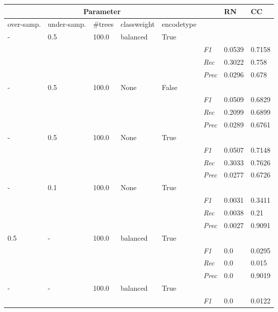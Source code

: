 \begin{table}[]
    \tiny
    \tabcolsep=0.11cm
    \begin{tabularx}{\textwidth}{XXXXX|X|X|X}
    \toprule
    \multicolumn{5}{c}{Parameter} & & RN &  CC \\ \midrule
    over-\newline samp. & under-\newline samp. & \#trees & class\newline weight & encode\newline type  & & & \\ \midrule
    - & 0.5 & 100.0 & balanced & True & &  \\
    & & & & & \textit{F1} & 0.0539 & 0.7158        \\
    & & & & & \textit{Rec} &  0.3022 & 0.758    \\
    & & & & & \textit{Prec} & 0.0296 & 0.678  \\ \midrule
    - & 0.5 & 100.0 & None & False & &  \\
    & & & & & \textit{F1} & 0.0509 & 0.6829        \\
    & & & & & \textit{Rec} &  0.2099 & 0.6899    \\
    & & & & & \textit{Prec} & 0.0289 & 0.6761  \\ \midrule
    - & 0.5 & 100.0 & None & True & &  \\
    & & & & & \textit{F1} & 0.0507 & 0.7148        \\
    & & & & & \textit{Rec} &  0.3033 & 0.7626    \\
    & & & & & \textit{Prec} & 0.0277 & 0.6726  \\ \midrule
    - & 0.1 & 100.0 & None & True & &  \\
    & & & & & \textit{F1} & 0.0031 & 0.3411        \\
    & & & & & \textit{Rec} &  0.0038 & 0.21    \\
    & & & & & \textit{Prec} & 0.0027 & 0.9091  \\ \midrule
    0.5 & - & 100.0 & balanced & True & &  \\
    & & & & & \textit{F1} & 0.0 & 0.0295        \\
    & & & & & \textit{Rec} &  0.0 & 0.015    \\
    & & & & & \textit{Prec} & 0.0 & 0.9019  \\ \midrule
    - & - & 100.0 & balanced & True & &  \\
    & & & & & \textit{F1} & 0.0 & 0.0122        \\

\end{tabularx}
\end{table}
